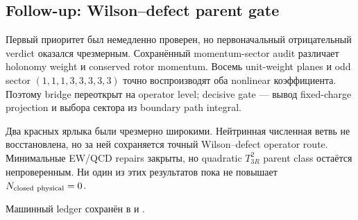 \subsection*{Follow-up: Wilson--defect parent gate}

Первый приоритет был немедленно проверен, но первоначальный отрицательный
verdict оказался чрезмерным. Сохранённый momentum-sector audit различает
holonomy weight и conserved rotor momentum. Восемь unit-weight planes и
odd sector \((1,1,1,3,3,3,3,3)\) точно воспроизводят оба nonlinear
коэффициента. Поэтому bridge переоткрыт на operator level; decisive gate ---
вывод fixed-charge projection и выбора сектора из boundary path integral.

\begin{theorem}
Два красных ярлыка были чрезмерно широкими. Нейтринная численная ветвь не
восстановлена, но за ней сохраняется точный Wilson--defect operator route.
Минимальные EW/QCD repairs закрыты, но quadratic \(T_{3R}^2\) parent class
остаётся непроверенным. Ни один из этих результатов пока не повышает
\(N_{\rm closed\ physical}=0\).
\end{theorem}

Машинный ledger сохранён в
 и
.
